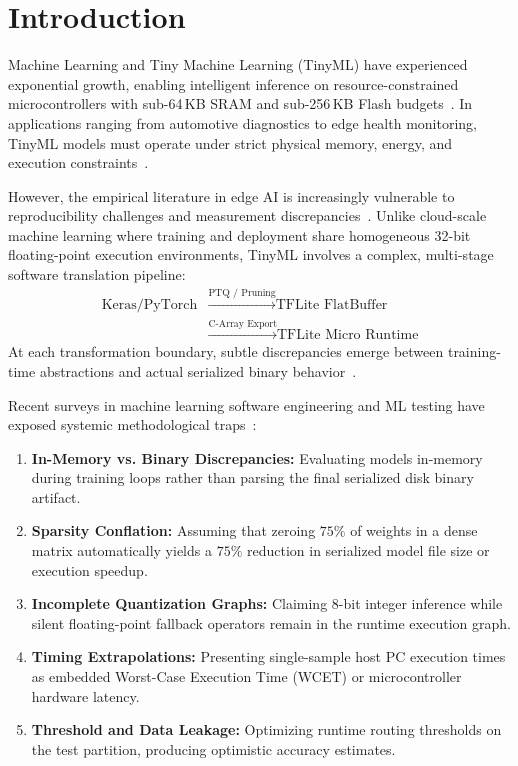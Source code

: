 \documentclass[journal]{IEEEtran}
\begin{document}
\maketitle
\IEEEdisplaynontitleabstractindextext

\section{Introduction}
 Machine Learning and Tiny Machine Learning (TinyML) have experienced exponential growth, enabling intelligent inference on resource-constrained microcontrollers with sub-64\,KB SRAM and sub-256\,KB Flash budgets~\cite{warden2019tinyml,ray2022review,sanchez2020tinyml}. In applications ranging from automotive diagnostics to edge health monitoring, TinyML models must operate under strict physical memory, energy, and execution constraints~\cite{banbury2021benchmarking,saha2022tinyml,sze2017efficient,liberis2021munas,cai2020once}.

However, the empirical literature in edge AI is increasingly vulnerable to reproducibility challenges and measurement discrepancies~\cite{pineau2021improving,kapoor2023leakage,henderson2018deep}. Unlike cloud-scale machine learning where training and deployment share homogeneous 32-bit floating-point execution environments, TinyML involves a complex, multi-stage software translation pipeline:
\begin{align*}
    \text{Keras/PyTorch} &\xrightarrow{\text{PTQ / Pruning}} \text{TFLite FlatBuffer} \\
    &\xrightarrow{\text{C-Array Export}} \text{TFLite Micro Runtime}
\end{align*}
At each transformation boundary, subtle discrepancies emerge between training-time abstractions and actual serialized binary behavior~\cite{david2021tensorflow,blalock2020state,lin2020mcunet}.

Recent surveys in machine learning software engineering and ML testing have exposed systemic methodological traps~\cite{sculley2015hidden,amershi2019software,zhang2022machine}:
\begin{enumerate}
    \item \textbf{In-Memory vs. Binary Discrepancies:} Evaluating models in-memory during training loops rather than parsing the final serialized disk binary artifact.
    \item \textbf{Sparsity Conflation:} Assuming that zeroing $75\%$ of weights in a dense matrix automatically yields a $75\%$ reduction in serialized model file size or execution speedup.
    \item \textbf{Incomplete Quantization Graphs:} Claiming 8-bit integer inference while silent floating-point fallback operators remain in the runtime execution graph.
    \item \textbf{Timing Extrapolations:} Presenting single-sample host PC execution times as embedded Worst-Case Execution Time (WCET) or microcontroller hardware latency.
    \item \textbf{Threshold and Data Leakage:} Optimizing runtime routing thresholds on the test partition, producing optimistic accuracy estimates.
\end{enumerate}
\end{document}

